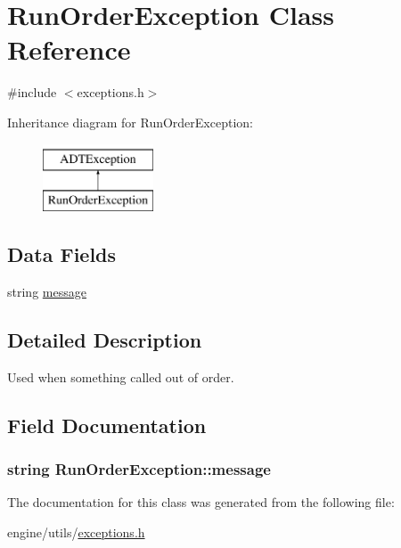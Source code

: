 \hypertarget{classRunOrderException}{
\section{RunOrderException Class Reference}
\label{classRunOrderException}
}


{\ttfamily \#include $<$exceptions.h$>$}

Inheritance diagram for RunOrderException:\begin{figure}[H]
\begin{center}
\leavevmode
\includegraphics[height=2cm]{classRunOrderException}
\end{center}
\end{figure}
\subsection*{Data Fields}
\begin{DoxyCompactItemize}
\item 
string \hyperlink{classRunOrderException_aed5972b7666d8edb24f9ffe4ef4ed4d2}{message}
\end{DoxyCompactItemize}


\subsection{Detailed Description}
Used when something called out of order. 

\subsection{Field Documentation}
\hypertarget{classRunOrderException_aed5972b7666d8edb24f9ffe4ef4ed4d2}{
\subsubsection[{message}]{\setlength{\rightskip}{0pt plus 5cm}string {\bf RunOrderException::message}}}
\label{classRunOrderException_aed5972b7666d8edb24f9ffe4ef4ed4d2}


The documentation for this class was generated from the following file:\begin{DoxyCompactItemize}
\item 
engine/utils/\hyperlink{exceptions_8h}{exceptions.h}\end{DoxyCompactItemize}
